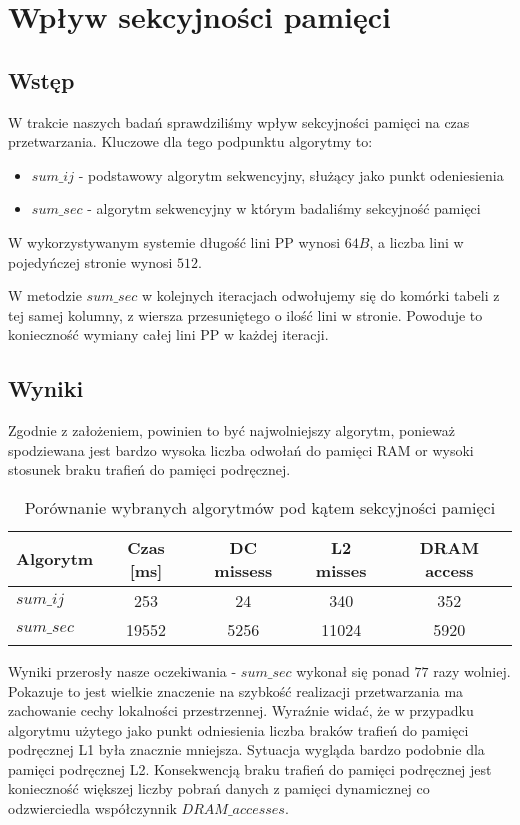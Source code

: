 \section{Wpływ sekcyjności pamięci}

\subsection{Wstęp}

W trakcie naszych badań sprawdziliśmy wpływ sekcyjności pamięci na czas przetwarzania. Kluczowe dla tego podpunktu algorytmy to:

\begin{itemize}
\item $sum\_ij$ - podstawowy algorytm sekwencyjny, służący jako punkt odeniesienia
\item $sum\_sec$ - algorytm sekwencyjny w którym badaliśmy sekcyjność pamięci
\end{itemize}

W wykorzystywanym systemie długość lini PP wynosi $64B$, a liczba lini w pojedyńczej stronie wynosi $512$.\newline

W metodzie $sum\_sec$ w kolejnych iteracjach odwołujemy się do komórki tabeli z tej samej kolumny, z wiersza przesuniętego o ilość lini w stronie. Powoduje to konieczność wymiany całej lini PP w każdej iteracji.

\subsection{Wyniki}

Zgodnie z założeniem, powinien to być najwolniejszy algorytm, ponieważ spodziewana jest bardzo wysoka liczba odwołań do pamięci RAM or wysoki stosunek braku trafień do pamięci podręcznej.

\begin{table}[H]
\centering
\begin{tabular}{|l|c|c|c|c|}
\hline
Algorytm & Czas [ms] & DC missess & L2 misses & DRAM access \\ \hline
$sum\_ij$ & 253 & 24 & 340 & 352 \\ \hline
$sum\_sec$ & 19552 & 5256 & 11024 & 5920 \\ \hline
\end{tabular}
\caption{Porównanie wybranych algorytmów pod kątem sekcyjności pamięci}
\end{table}

Wyniki przerosły nasze oczekiwania - $sum\_sec$ wykonał się ponad $77$ razy wolniej. Pokazuje to jest wielkie znaczenie na szybkość realizacji przetwarzania ma zachowanie cechy lokalności przestrzennej. Wyraźnie widać, że w przypadku algorytmu użytego jako punkt odniesienia liczba braków trafień do pamięci podręcznej L1 była znacznie mniejsza. Sytuacja wygląda bardzo podobnie dla pamięci podręcznej L2. Konsekwencją braku trafień do pamięci podręcznej jest konieczność większej liczby pobrań danych z pamięci dynamicznej co odzwierciedla współczynnik $DRAM\_accesses$.
